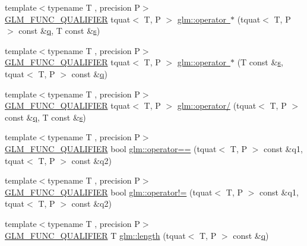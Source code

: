 \begin{DoxyCompactItemize}
\item 
{\footnotesize template$<$typename T , precision P$>$ }\\\mbox{\hyperlink{setup_8hpp_a33fdea6f91c5f834105f7415e2a64407}{G\+L\+M\+\_\+\+F\+U\+N\+C\+\_\+\+Q\+U\+A\+L\+I\+F\+I\+ER}} tquat$<$ T, P $>$ \mbox{\hyperlink{group__gtc__quaternion_ga1e92069464e09ce81a9a27d67b9ef440}{glm\+::operator $\ast$}} (tquat$<$ T, P $>$ const \&\mbox{\hyperlink{glad_8h_a514729309336df22bcc8eda979d6ced4}{q}}, T const \&\mbox{\hyperlink{glad_8h_af1b1d5edfea6a34daee7389b1b5810ad}{s}})
\item 
{\footnotesize template$<$typename T , precision P$>$ }\\\mbox{\hyperlink{setup_8hpp_a33fdea6f91c5f834105f7415e2a64407}{G\+L\+M\+\_\+\+F\+U\+N\+C\+\_\+\+Q\+U\+A\+L\+I\+F\+I\+ER}} tquat$<$ T, P $>$ \mbox{\hyperlink{group__gtc__quaternion_ga75ae9786475c53c29b719174cb5c38f4}{glm\+::operator $\ast$}} (T const \&\mbox{\hyperlink{glad_8h_af1b1d5edfea6a34daee7389b1b5810ad}{s}}, tquat$<$ T, P $>$ const \&\mbox{\hyperlink{glad_8h_a514729309336df22bcc8eda979d6ced4}{q}})
\item 
{\footnotesize template$<$typename T , precision P$>$ }\\\mbox{\hyperlink{setup_8hpp_a33fdea6f91c5f834105f7415e2a64407}{G\+L\+M\+\_\+\+F\+U\+N\+C\+\_\+\+Q\+U\+A\+L\+I\+F\+I\+ER}} tquat$<$ T, P $>$ \mbox{\hyperlink{group__gtc__quaternion_gab52fd3ac627908aa2aa1df96ddcdd113}{glm\+::operator/}} (tquat$<$ T, P $>$ const \&\mbox{\hyperlink{glad_8h_a514729309336df22bcc8eda979d6ced4}{q}}, T const \&\mbox{\hyperlink{glad_8h_af1b1d5edfea6a34daee7389b1b5810ad}{s}})
\item 
{\footnotesize template$<$typename T , precision P$>$ }\\\mbox{\hyperlink{setup_8hpp_a33fdea6f91c5f834105f7415e2a64407}{G\+L\+M\+\_\+\+F\+U\+N\+C\+\_\+\+Q\+U\+A\+L\+I\+F\+I\+ER}} bool \mbox{\hyperlink{group__gtc__quaternion_ga7070e4e3cfdac395b3392219a365d95b}{glm\+::operator==}} (tquat$<$ T, P $>$ const \&q1, tquat$<$ T, P $>$ const \&q2)
\item 
{\footnotesize template$<$typename T , precision P$>$ }\\\mbox{\hyperlink{setup_8hpp_a33fdea6f91c5f834105f7415e2a64407}{G\+L\+M\+\_\+\+F\+U\+N\+C\+\_\+\+Q\+U\+A\+L\+I\+F\+I\+ER}} bool \mbox{\hyperlink{group__gtc__quaternion_gacbe1e859eb6558097bac5ec45955c60a}{glm\+::operator!=}} (tquat$<$ T, P $>$ const \&q1, tquat$<$ T, P $>$ const \&q2)
\item 
{\footnotesize template$<$typename T , precision P$>$ }\\\mbox{\hyperlink{setup_8hpp_a33fdea6f91c5f834105f7415e2a64407}{G\+L\+M\+\_\+\+F\+U\+N\+C\+\_\+\+Q\+U\+A\+L\+I\+F\+I\+ER}} T \mbox{\hyperlink{group__gtc__quaternion_gac682181783027544c8d251b4d3a60cf8}{glm\+::length}} (tquat$<$ T, P $>$ const \&\mbox{\hyperlink{glad_8h_a514729309336df22bcc8eda979d6ced4}{q}})

\end{DoxyCompactItemize}

